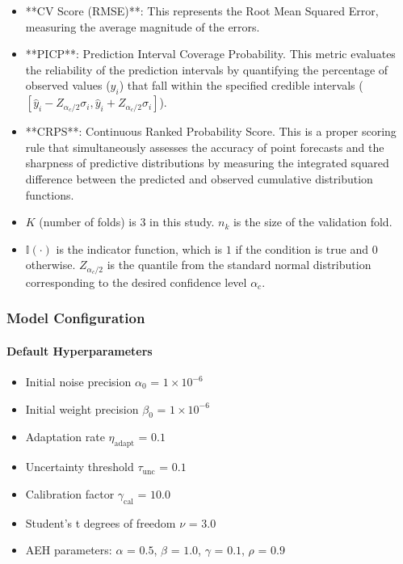 \begin{itemize}

\item **CV Score (RMSE)**: This represents the Root Mean Squared Error, measuring the average magnitude of the errors.

\item **PICP**: Prediction Interval Coverage Probability. This metric evaluates the reliability of the prediction intervals by quantifying the percentage of observed values ($y_i$) that fall within the specified credible intervals ( $[\hat{y}_i - Z_{\alpha_c/2}\sigma_i, \hat{y}_i + Z_{\alpha_c/2}\sigma_i]$).

\item **CRPS**: Continuous Ranked Probability Score. This is a proper scoring rule that simultaneously assesses the accuracy of point forecasts and the sharpness of predictive distributions by measuring the integrated squared difference between the predicted and observed cumulative distribution functions.

\item $K$ (number of folds) is $3$ in this study. $n_k$ is the size of the validation fold.

\item $\mathbb{I}(\cdot)$ is the indicator function, which is $1$ if the condition is true and $0$ otherwise. $Z_{\alpha_c/2}$ is the quantile from the standard normal distribution corresponding to the desired confidence level $\alpha_c$. 

\end{itemize}

\subsubsection{Model Configuration}

\paragraph{Default Hyperparameters}
\begin{itemize}
\item Initial noise precision $\alpha_0$ = $1 \times 10^{-6}$
\item Initial weight precision $\beta_0$ = $1 \times 10^{-6}$
\item Adaptation rate $\eta_{\text{adapt}}$ = $0.1$
\item Uncertainty threshold $\tau_{\text{unc}}$ = $0.1$
\item Calibration factor $\gamma_{\text{cal}}$ = $10.0$
\item Student's t degrees of freedom $\nu$ = $3.0$
\item AEH parameters: $\alpha$ = $0.5$, $\beta$ = $1.0$, $\gamma$ = $0.1$, $\rho$ = $0.9$
\end{itemize}

